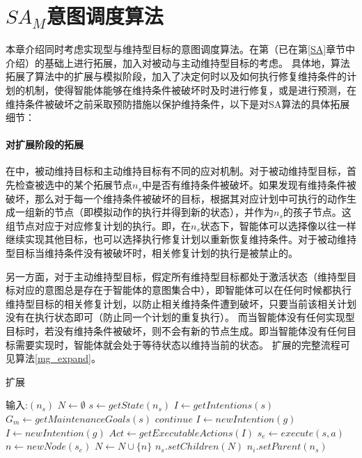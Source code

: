 \section{$SA_M$意图调度算法}
本章介绍同时考虑实现型与维持型目标的意图调度算法\SAM 。\SAM 在第\SA （已在第\ref{SA}章节中介绍）的基础上进行拓展，加入对被动与主动维持型目标的考虑。
具体地，\SAM 算法拓展了\SA 算法中的扩展与模拟阶段，加入了决定何时以及如何执行修复维持条件的计划的机制，使得智能体能够在维持条件被破坏时及时进行修复，或是进行预测，在维持条件被破坏之前采取预防措施以保护维持条件，以下是对SA算法的具体拓展细节：

\paragraph{对扩展阶段的拓展}
在\SAM 中，被动维持目标和主动维持目标有不同的应对机制。对于被动维持型目标，\SAM 首先检查被选中的某个拓展节点$n_s$中是否有维持条件被破坏。如果发现有维持条件被破坏，那么对于每一个维持条件被破坏的目标，根据其对应计划中可执行的动作生成一组新的节点（即模拟动作的执行并得到新的状态），并作为$n_s$的孩子节点。这组节点对应于对应修复计划的执行。即，在$n_s$状态下，智能体可以选择像以往一样继续实现其他目标，也可以选择执行修复计划以重新恢复维持条件。对于被动维持型目标当维持条件没有被破坏时，相关修复计划的执行是被禁止的。

另一方面，对于主动维持型目标，\SAM 假定所有维持型目标都处于激活状态（维持型目标对应的意图总是存在于智能体的意图集合中），即智能体可以在任何时候都执行维持型目标的相关修复计划，以防止相关维持条件遭到破坏，只要当前该相关计划没有在执行状态即可（防止同一个计划的重复执行）。
而当智能体没有任何实现型目标时，若没有维持条件被破坏，则不会有新的节点生成。即当智能体没有任何目标需要实现时，智能体就会处于等待状态以维持当前的状态。
扩展的完整流程可见算法\ref{mg_expand}。
\begin{algorithm}[H]
\caption{扩展}\label{mg_expand}
\begin{algorithmic}[1]
\STATE 输入:$(n_s)$
      \STATE $N \gets \emptyset$
      \STATE $s \gets getState(n_s)$
      \STATE $I \gets getIntentions(s)$
      \STATE $G_m \gets getMaintenanceGoals(s)$
        \STATE $continue$
      \ENDIF
        \STATE $I \gets newIntention(g)$
      \ENDIF
        \STATE $I \gets newIntention(g)$
      \ENDIF
    \ENDFOR
    \STATE $Act \gets getExecutableActions(I)$
      \STATE $s_e \gets execute(s, a)$
      \STATE $n \gets newNode(s_e)$
      \STATE $N \gets N \cup \{n\}$
    \ENDFOR
    \STATE $n_s.setChildren(N)$
    \STATE $n_i.setParent(n_s)$
    \ENDFOR
\end{algorithmic}
\end{algorithm}


